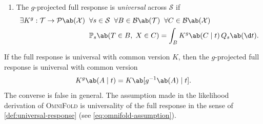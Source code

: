 \documentclass[12pt]{article}
\newcommand{\Prb}{\mathbb{P}}
\newcommand{\Gens}{\mathcal{S}}
\newcommand{\Meas}{\mathcal{P}}
\newcommand{\Borel}{\mathcal{B}}
\newcommand{\1}{\mathbbm{1}}
\renewcommand{\[}{\begin{equation}}
\renewcommand{\]}{\end{equation}}
\begin{document}
\begin{definition}[Universality]
\begin{enumerate}
            \item The \(g\)-projected full response is \emph{universal} across \(\Gens\) if
            \[
                \begin{split}
                    \exists K^g : \mathcal T \to \Meas \ab(\mathcal X) \;\; &\forall s \in \Gens \;\; \forall B \in \Borel \ab(\mathcal T) \;\; \forall C \in \Borel \ab(\mathcal X) \\
                    &\Prb_s \ab( T \in B,\; X \in C) = \int_B K^g \ab(C \mid t) \, Q_s \ab(\d t).
                \end{split}
            \]
        \end{enumerate}
    \end{definition}

    If the full response is universal with common version \(K\), then the \(g\)-projected full response is universal with common version
    \[
    \label{eq:projected-kernel}
        K^g \ab(A \mid t) = K \ab[g^{-1}\ab(A)\mid t].
    \]
    The converse is false in general.
    The assumption made in the likelihood derivation of \textsc{OmniFold} is universality of the full response in the sense of \cref{def:universal-response} (see \cref{eq:omnifold-assumption}).
\end{document}
